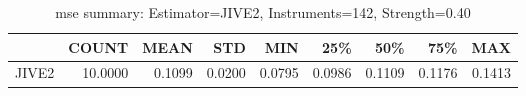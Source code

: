 \begin{table}[ht]
\centering
\caption{mse summary: Estimator=JIVE2, Instruments=142, Strength=0.40}
\begin{tabular}{lrrrrrrrr}
\toprule
 & COUNT & MEAN & STD & MIN & 25\% & 50\% & 75\% & MAX \\
\midrule
JIVE2 & 10.0000 & 0.1099 & 0.0200 & 0.0795 & 0.0986 & 0.1109 & 0.1176 & 0.1413 \\
\bottomrule
\end{tabular}
\end{table}
